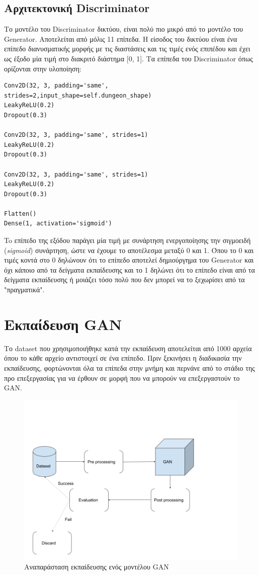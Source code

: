 \subsection{Αρχιτεκτονική Discriminator}
Το μοντέλο του Discriminator δικτύου, είναι πολύ πιο μικρό από το μοντέλο του Generator. Αποτελείται από μόλις 11 επίπεδα. Η είσοδος του δικτύου είναι ένα επίπεδο διανυσματικής μορφής με τις διαστάσεις και τις τιμές ενός επιπέδου και έχει ως έξοδο μία τιμή στο διακριτό διάστημα [0, 1].
\newline
Τα επίπεδα του Discriminator όπως ορίζονται στην υλοποίηση:
\begin{verbatim}
Conv2D(32, 3, padding='same', strides=2,input_shape=self.dungeon_shape)
LeakyReLU(0.2)
Dropout(0.3)

Conv2D(32, 3, padding='same', strides=1)
LeakyReLU(0.2)
Dropout(0.3)

Conv2D(32, 3, padding='same', strides=1)
LeakyReLU(0.2)
Dropout(0.3)

Flatten()
Dense(1, activation='sigmoid')
\end{verbatim}

\par
To επίπεδο της εξόδου παράγει μία τιμή με συνάρτηση ενεργοποίησης την σιγμοειδή (\textit{sigmoid}) συνάρτηση, ώστε να έχουμε το αποτέλεσμα μεταξύ 0 και 1. Όπου το 0 και τιμές κοντά στο 0 δηλώνουν ότι το επίπεδο αποτελεί δημιούργημα του Generator και όχι κάποιο από τα δείγματα εκπαίδευσης και το 1 δηλώνει ότι το επίπεδο είναι από τα δείγματα εκπαίδευσης ή μοιάζει τόσο πολύ που δεν μπορεί να το ξεχωρίσει από τα "πραγματικά".


\section{Εκπαίδευση GAN}
Το dataset που χρησιμοποιήθηκε κατά την εκπαίδευση αποτελείται από 1000 αρχεία όπου το κάθε αρχείο αντιστοιχεί σε ένα επίπεδο. Πριν ξεκινήσει η διαδικασία την εκπαίδευσης, φορτώνονται όλα τα επίπεδα στην μνήμη και περνάνε από το στάδιο της προ επεξεργασίας για να έρθουν σε μορφή που να μπορούν να επεξεργαστούν το GAN.
\par

\begin{figure}[H]
\centering
\includegraphics[width=.8\linewidth]{../images/graphs/Abstract_functionality.png}
\caption{Αναπαράσταση εκπαίδευσης ενός μοντέλου GAN}
\label{fig:fig}
\end{figure}

